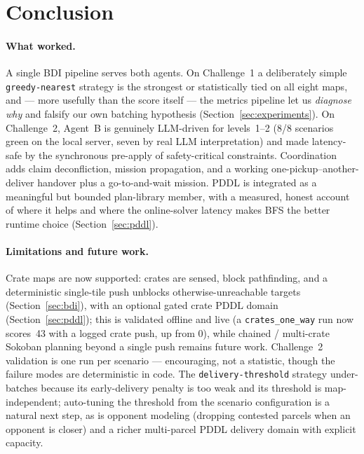 \section{Conclusion}

\paragraph{What worked.} A single BDI pipeline serves both agents. On
Challenge~1 a deliberately simple \texttt{greedy-nearest} strategy is the
strongest or statistically tied on all eight maps, and --- more usefully than
the score itself --- the metrics pipeline let us \emph{diagnose why} and falsify
our own batching hypothesis (Section~\ref{sec:experiments}). On Challenge~2,
Agent~B is genuinely LLM-driven for levels~1--2 (8/8 scenarios green on the
local server, seven by real LLM interpretation) and made latency-safe by the
synchronous pre-apply of safety-critical constraints. Coordination adds claim
deconfliction, mission propagation, and a working one-pickup--another-deliver
handover plus a go-to-and-wait mission. PDDL is integrated as a meaningful but
bounded plan-library member, with a measured, honest account of where it helps
and where the online-solver latency makes BFS the better runtime choice
(Section~\ref{sec:pddl}).

\paragraph{Limitations and future work.} Crate maps are now supported: crates
are sensed, block pathfinding, and a deterministic single-tile push unblocks
otherwise-unreachable targets (Section~\ref{sec:bdi}), with an optional gated
crate PDDL domain (Section~\ref{sec:pddl}); this is validated offline and live
(a \texttt{crates\_one\_way} run now scores~43 with a logged crate push, up from
0), while chained / multi-crate Sokoban planning beyond a single push remains
future work.
Challenge~2 validation is one run per scenario --- encouraging,
not a statistic, though the failure modes are deterministic in code. The
\texttt{delivery-threshold} strategy under-batches because its early-delivery
penalty is too weak and its threshold is map-independent; auto-tuning the
threshold from the scenario configuration is a natural next step, as is opponent
modeling (dropping contested parcels when an opponent is closer) and a richer
multi-parcel PDDL delivery domain with explicit capacity.

